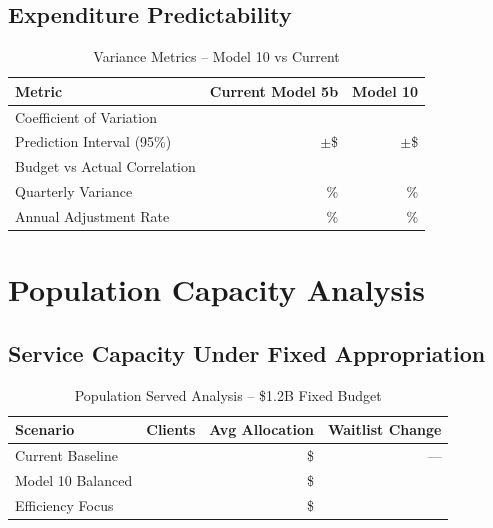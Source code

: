 \subsection{Expenditure Predictability}

\begin{table}[h]
\centering
\caption{Variance Metrics -- Model 10 vs Current}
\begin{tabular}{lrr}
\toprule
\textbf{Metric} & \textbf{Current Model 5b} & \textbf{Model 10} \\
\midrule
Coefficient of Variation & \ModelTenCVActual{} & \ModelTenCVPredicted{} \\
Prediction Interval (95\%) & $\pm$\$\ModelTenPredictionInterval{} & $\pm$\$\ModelTenPredictionInterval{} \\
Budget vs Actual Correlation & \ModelTenBudgetActualCorr{} & \ModelTenBudgetActualCorr{} \\
Quarterly Variance & \ModelTenQuarterlyVariance{}\% & \ModelTenQuarterlyVariance{}\% \\
Annual Adjustment Rate & \ModelTenAnnualAdjustmentRate{}\% & \ModelTenAnnualAdjustmentRate{}\% \\
\bottomrule
\end{tabular}
\end{table}

\section{Population Capacity Analysis}

\subsection{Service Capacity Under Fixed Appropriation}

\begin{table}[h]
\centering
\caption{Population Served Analysis -- \$1.2B Fixed Budget}
\begin{tabular}{lrrr}
\toprule
\textbf{Scenario} & \textbf{Clients} & \textbf{Avg Allocation} & \textbf{Waitlist Change} \\
\midrule
Current Baseline & \ModelTenPopcurrentbaselineClients{} & \$\ModelTenPopcurrentbaselineAvgAlloc{} & --- \\
Model 10 Balanced & \ModelTenPopmodelbalancedClients{} & \$\ModelTenPopmodelbalancedAvgAlloc{} & \ModelTenPopmodelbalancedWaitlistChange{} \\
Efficiency Focus & \ModelTenPopmodelefficiencyClients{} & \$\ModelTenPopmodelefficiencyAvgAlloc{} & \ModelTenPopmodelefficiencyWaitlistChange{} \\
\bottomrule
\end{tabular}
\end{table}

